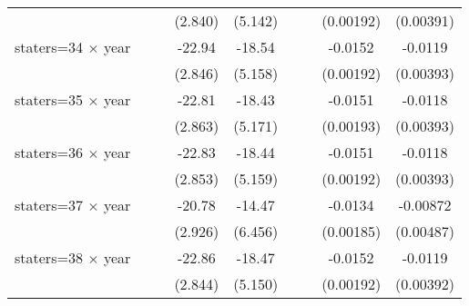 {\begin{longtable}{l*{8}{c}}
                    &                     &                     &     (2.840)         &     (5.142)         &                     &                     &   (0.00192)         &   (0.00391)         \\
[1em]
staters=34 $\times$ year&                     &                     &      -22.94\sym{***}&      -18.54\sym{***}&                     &                     &     -0.0152\sym{***}&     -0.0119\sym{***}\\
                    &                     &                     &     (2.846)         &     (5.158)         &                     &                     &   (0.00192)         &   (0.00393)         \\
[1em]
staters=35 $\times$ year&                     &                     &      -22.81\sym{***}&      -18.43\sym{***}&                     &                     &     -0.0151\sym{***}&     -0.0118\sym{***}\\
                    &                     &                     &     (2.863)         &     (5.171)         &                     &                     &   (0.00193)         &   (0.00393)         \\
[1em]
staters=36 $\times$ year&                     &                     &      -22.83\sym{***}&      -18.44\sym{***}&                     &                     &     -0.0151\sym{***}&     -0.0118\sym{***}\\
                    &                     &                     &     (2.853)         &     (5.159)         &                     &                     &   (0.00192)         &   (0.00393)         \\
[1em]
staters=37 $\times$ year&                     &                     &      -20.78\sym{***}&      -14.47\sym{**} &                     &                     &     -0.0134\sym{***}&    -0.00872\sym{*}  \\
                    &                     &                     &     (2.926)         &     (6.456)         &                     &                     &   (0.00185)         &   (0.00487)         \\
[1em]
staters=38 $\times$ year&                     &                     &      -22.86\sym{***}&      -18.47\sym{***}&                     &                     &     -0.0152\sym{***}&     -0.0119\sym{***}\\
                    &                     &                     &     (2.844)         &     (5.150)         &                     &                     &   (0.00192)         &   (0.00392)         \\

\end{longtable}}

